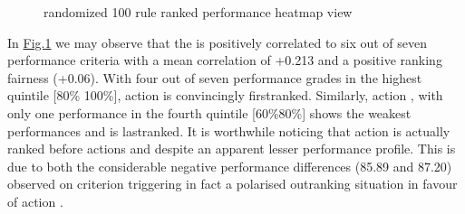 \documentclass[a4paper,12pt,english]{sphinxhowto}
\let\sphinxpxdimen\pdfpxdimen\else\newdimen\sphinxpxdimen
\begin{document}
\begin{figure}[H]
\centering
\capstart

\noindent\sphinxincludegraphics[width=400\sphinxpxdimen]{{BachetHeatmap}.png}
\caption{ randomized 100 rule ranked performance heatmap view}\label{\detokenize{pearls:bachetheatmap}}\end{figure}

\sphinxAtStartPar
In \hyperref[\detokenize{pearls:bachetheatmap}]{Fig.\@ \ref{\detokenize{pearls:bachetheatmap}}} we may observe that the  is positively correlated to six out of seven performance criteria with a mean correlation of +0.213 and a positive ranking fairness (+0.06).  With four out of seven performance grades in the highest quintile {[}80\% \sphinxhyphen{} 100\%{]}, action  is convincingly first\sphinxhyphen{}ranked. Similarly, action , with only one performance in the fourth quintile {[}60\%\sphinxhyphen{}80\%{]} shows the weakest performances and is last\sphinxhyphen{}ranked. It is worthwhile noticing that action  is actually ranked before actions  and  despite an apparent lesser performance profile. This is due to both the considerable negative performance differences (\sphinxhyphen{}85.89 and \sphinxhyphen{}87.20) observed on criterion  triggering in fact a polarised outranking situation in favour of action .
\end{document}
